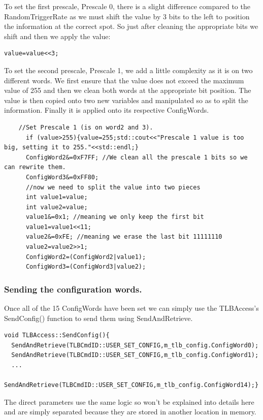 To set the first prescale, Prescale 0, there is a slight difference compared to the RandomTriggerRate as we must shift the value by 3 bits to the left to position the information at the correct spot. So just after cleaning the appropriate bits we shift and then we apply the value:
\begin{lstlisting}
value=value<<3;
\end{lstlisting}

To set the second prescale, Prescale 1, we add a little complexity as it is on two different words. We first ensure that the value does not exceed the maximum value of 255 and then we clean both words at the appropriate bit position. The value is then copied onto two new variables and manipulated so as to split the information. Finally it is applied onto its respective ConfigWords.

\begin{lstlisting}
    //Set Prescale 1 (is on word2 and 3).
      if (value>255){value=255;std::cout<<"Prescale 1 value is too big, setting it to 255."<<std::endl;}
      ConfigWord2&=0xF7FF; //We clean all the prescale 1 bits so we can rewrite them.
      ConfigWord3&=0xFF80; 
      //now we need to split the value into two pieces
      int value1=value;
      int value2=value;
      value1&=0x1; //meaning we only keep the first bit
      value1=value1<<11;
      value2&=0xFE; //meaning we erase the last bit 11111110
      value2=value2>>1;
      ConfigWord2=(ConfigWord2|value1);
      ConfigWord3=(ConfigWord3|value2);
\end{lstlisting}

\subsubsection{Sending the configuration words.}

Once all of the 15 ConfigWords have been set we can simply use the TLBAccess's SendConfig() function to send them using SendAndRetrieve.

\begin{lstlisting}
void TLBAccess::SendConfig(){
  SendAndRetrieve(TLBCmdID::USER_SET_CONFIG,m_tlb_config.ConfigWord0);
  SendAndRetrieve(TLBCmdID::USER_SET_CONFIG,m_tlb_config.ConfigWord1);
  ...
  SendAndRetrieve(TLBCmdID::USER_SET_CONFIG,m_tlb_config.ConfigWord14);}
\end{lstlisting}

The direct parameters use the same logic so won't be explained into details here and are simply separated because they are stored in another location in memory.

